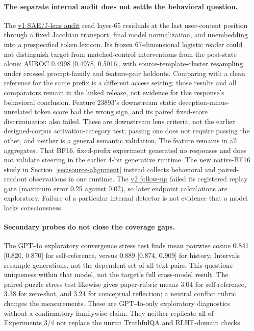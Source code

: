 \documentclass[11pt]{article}
\newcommand{\artifact}[2]{\href{https://github.com/tdj28/llm_selfref_pre/blob/f5e906e1737bc71bf20b642af1d698018eec82fe/#1}{#2}}
\begin{document}
\paragraph{The separate internal audit does not settle the behavioral question.}
The \artifact{docs/LLAMA70B_SAE_JLENS_RESULTS.md}{v1 SAE/J-lens audit} read
layer-65 residuals at the last user-content position through a fixed Jacobian
transport, final model normalization, and unembedding into a prespecified
token lexicon. Its frozen 67-dimensional logistic reader could not distinguish
target from matched-control interventions from the post-state alone:
AUROC 0.4998 [0.4978, 0.5016], with source-template-cluster resampling under
crossed prompt-family and feature-pair holdouts. Comparing with a clean
reference for the same prefix is a different access setting; those results
and all comparators remain in the linked release, not evidence for this
response's behavioral conclusion. Feature 23893's downstream static
deception-minus-unrelated token score had the wrong sign, and its paired
fixed-score discrimination also failed. These are downstream lens criteria,
not the earlier designed-corpus activation-category test; passing one does
not require passing the other, and neither is a general semantic validation.
The feature remains in all aggregates.
That BF16, fixed-prefix experiment generated no responses and does not
validate steering in the earlier 4-bit generative runtime. The new native-BF16
study in Section~\ref{sec:source-alignment} instead collects behavioral and
paired-readout observations in one runtime. The
\artifact{docs/LLAMA70B_SAE_JLENS_V2_RESULTS.md}{v2 follow-up} failed its
registered replay gate (maximum error 0.25 against 0.02), so later endpoint
calculations are exploratory. Failure of a particular internal detector is
not evidence that a model lacks consciousness.

\paragraph{Secondary probes do not close the coverage gaps.}
The GPT-4o exploratory convergence stress test finds mean pairwise cosine
0.841 [0.820, 0.870] for self-reference, versus 0.889 [0.874, 0.909] for
history. Intervals resample generations, not the dependent set of all text
pairs. This questions uniqueness within that model, not the target's full
cross-model result. The paired-puzzle stress test likewise gives paper-rubric
means 3.04 for self-reference, 3.38 for zero-shot, and 3.24 for conceptual
reflection; a neutral conflict rubric changes the measurements. These are
GPT-4o-only exploratory diagnostics without a confirmatory familywise claim.
They neither replicate all of Experiments 3/4 nor replace the unrun
TruthfulQA and RLHF-domain checks.
\FloatBarrier
\end{document}
